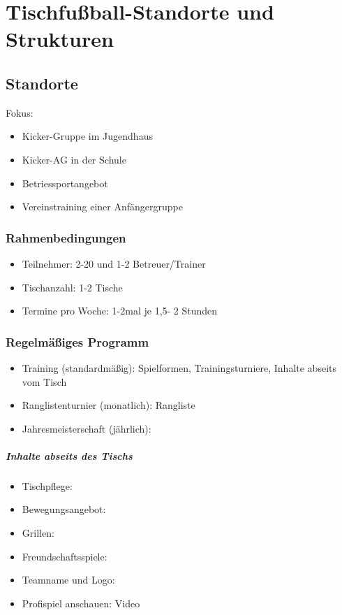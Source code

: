 \chapter{Tischfußball-Standorte und Strukturen}
\label{weiteres}


\section{Standorte}

Fokus:
\begin{itemize}
\item Kicker-Gruppe im Jugendhaus
\item Kicker-AG in der Schule
\item Betriessportangebot
\item Vereinstraining einer Anfängergruppe  
\end{itemize}

\subsection{Rahmenbedingungen}

\begin{itemize}
\item Teilnehmer: 2-20 und 1-2 Betreuer/Trainer
\item Tischanzahl: 1-2 Tische
\item Termine pro Woche: 1-2mal je 1,5- 2 Stunden
\end{itemize}

\subsection{Regelmäßiges Programm}

\begin{itemize}
\item Training (standardmäßig): Spielformen, Trainingsturniere, Inhalte abseits vom Tisch   
\item Ranglistenturnier (monatlich): 
Rangliste  
\item Jahresmeisterschaft (jährlich):
\end{itemize}  

\paragraph{Inhalte abseits des Tischs}
\begin{itemize}
\item Tischpflege:  
\item Bewegungsangebot: 
\item Grillen:
\item Freundschaftsspiele:
\item Teamname und Logo:
\item Profispiel anschauen: Video 
\end{itemize} 

